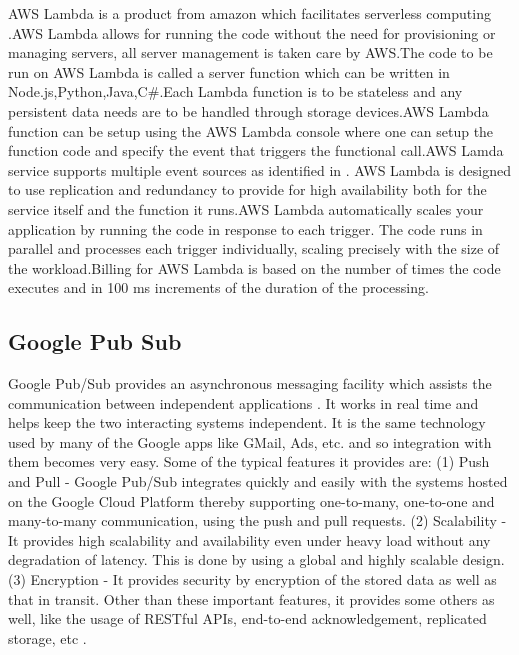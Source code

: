      AWS Lambda is a product from amazon which facilitates serverless
     computing \cite{www-awslambda}.AWS Lambda allows for running the
     code without the need for provisioning or managing servers, all
     server management is taken care by AWS.The code to be run on AWS
     Lambda is called a server function which can be written in
     Node.js,Python,Java,C\#.Each Lambda function is to be stateless
     and any persistent data needs are to be handled through storage
     devices.AWS Lambda function can be setup using the AWS Lambda
     console where one can setup the function code and specify the
     event that triggers the functional call.AWS Lamda service
     supports multiple event sources as identified in
     \cite{www-awslambdaevent}. AWS Lambda is designed to use
     replication and redundancy to provide for high availability both
     for the service itself and the function it runs.AWS Lambda
     automatically scales your application by running the code in
     response to each trigger. The code runs in parallel and processes
     each trigger individually, scaling precisely with the size of the
     workload.Billing for AWS Lambda is based on the number of times
     the code executes and in 100 ms increments of the duration of the
     processing.

\subsection{ Google Pub Sub}

     Google Pub/Sub provides an asynchronous messaging facility which 
     assists the communication between independent applications 
     \cite{www-google-pub-sub}. It works in real time and helps
     keep the two interacting systems independent. It is the same
     technology used by many of the Google apps like GMail, Ads,
     etc. and so integration with them becomes very
     easy.  Some of the typical features it provides are: (1) Push 
     and Pull - Google Pub/Sub integrates quickly and easily with 
     the systems hosted on the Google Cloud Platform thereby supporting 
     one-to-many, one-to-one and many-to-many communication, using 
     the push and pull requests. (2) Scalability - It provides high 
     scalability and availability even under heavy load without any 
     degradation of latency. This is done by using a global and highly 
     scalable design. (3) Encryption - It provides security by encryption of
     the stored data as well as that in transit. Other than these
     important features, it provides some others as well, like the
     usage of RESTful APIs, end-to-end acknowledgement, replicated
     storage, etc \cite{www-google-pub-sub-features}.
     
